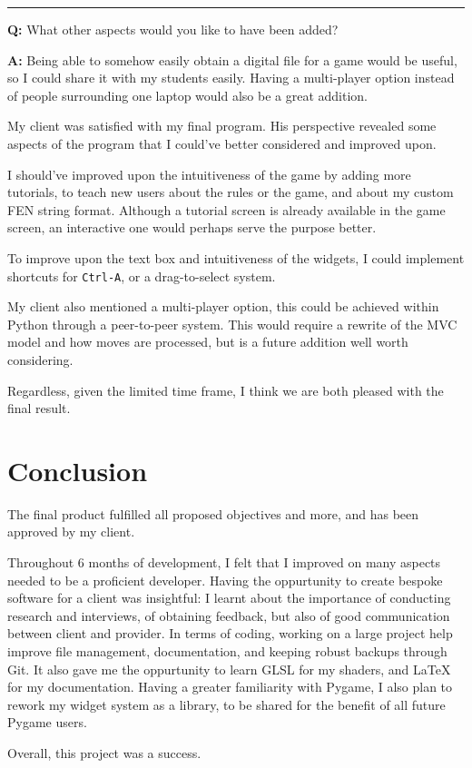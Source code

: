 \documentclass[../main/main.tex]{subfiles}
\begin{document}
\noindent\rule{\textwidth}{0.4pt}

\noindent\textbf{Q:} What other aspects would you like to have been added?

\noindent\textbf{A:} Being able to somehow easily obtain a digital file for a game would be useful, so I could share it with my students easily. Having a multi-player option instead of people surrounding one laptop would also be a great addition.

\bigskip

My client was satisfied with my final program. His perspective revealed some aspects of the program that I could've better considered and improved upon.

I should've improved upon the intuitiveness of the game by adding more tutorials, to teach new users about the rules or the game, and about my custom FEN string format. Although a tutorial screen is already available in the game screen, an interactive one would perhaps serve the purpose better.

To improve upon the text box and intuitiveness of the widgets, I could implement shortcuts for \verb|Ctrl-A|, or a drag-to-select system.

My client also mentioned a multi-player option, this could be achieved within Python through a peer-to-peer system. This would require a rewrite of the MVC model and how moves are processed, but is a future addition well worth considering.

Regardless, given the limited time frame, I think we are both pleased with the final result.

\section{Conclusion}
The final product fulfilled all proposed objectives and more, and has been approved by my client.

Throughout 6 months of development, I felt that I improved on many aspects needed to be a proficient developer. Having the oppurtunity to create bespoke software for a client was insightful: I learnt about the importance of conducting research and interviews, of obtaining feedback, but also of good communication between client and provider. In terms of coding, working on a large project help improve file management, documentation, and keeping robust backups through Git. It also gave me the oppurtunity to learn GLSL for my shaders, and LaTeX for my documentation. Having a greater familiarity with Pygame, I also plan to rework my widget system as a library, to be shared for the benefit of all future Pygame users.

Overall, this project was a success.
\end{document}

